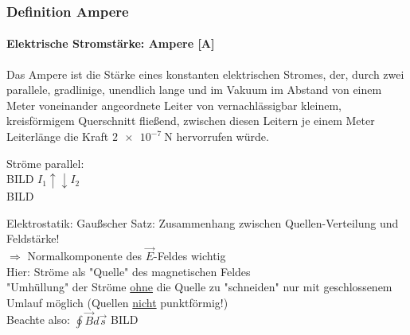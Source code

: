 \subsubsection{Definition Ampere}
\paragraph{Elektrische Stromstärke: Ampere [A]}
Das Ampere ist die Stärke eines konstanten elektrischen Stromes, der, durch zwei parallele, gradlinige, unendlich lange und im Vakuum im Abstand von einem Meter voneinander angeordnete Leiter von vernachlässigbar kleinem, kreisförmigem Querschnitt fließend, zwischen diesen Leitern je einem Meter Leiterlänge die Kraft $ \SI{2e-7}{\newton} $ hervorrufen würde.\hfill \break

Ströme parallel:\\
BILD
$ I_1 \uparrow\downarrow I_2 $ \\
BILD

Elektrostatik: Gaußscher Satz: Zusammenhang zwischen Quellen-Verteilung und Feldstärke! \\
\indent $ \Rightarrow $ Normalkomponente des $ \vec{E} $-Feldes wichtig\\
Hier: Ströme als "Quelle" des magnetischen Feldes \\
"Umhüllung" der Ströme \underline{ohne} die Quelle zu "schneiden" nur mit geschlossenem Umlauf möglich (Quellen \underline{nicht} punktförmig!)\\
Beachte also: $ \displaystyle \oint\vec{B}d\vec{s} $
BILD
